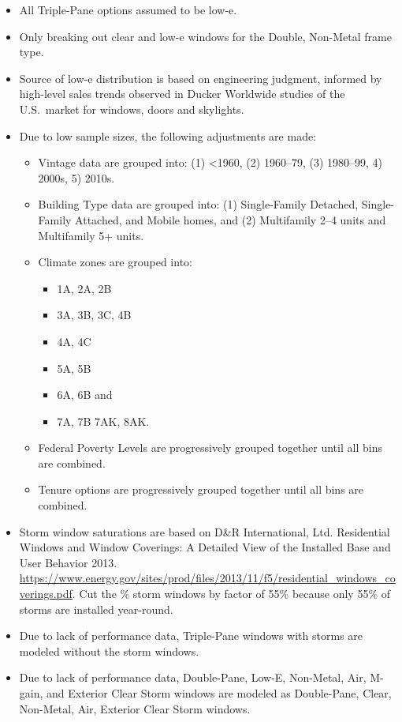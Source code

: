 \begin{itemize}

\item
  All Triple-Pane options assumed to be low-e.
\item
  Only breaking out clear and low-e windows for the Double, Non-Metal
  frame type.
\item
  Source of low-e distribution is based on engineering judgment,
  informed by high-level sales trends observed in Ducker Worldwide
  studies of the U.S.~market for windows, doors and skylights.
\item
  Due to low sample sizes, the following adjustments are made:

  \begin{itemize}
   
  \item
    Vintage data are grouped into: (1) \textless1960, (2) 1960--79,
    (3) 1980--99, 4) 2000s, 5) 2010s.
  \item
    Building Type data are grouped into: (1) Single-Family
    Detached, Single-Family Attached, and Mobile homes, and (2)
    Multifamily 2--4 units and Multifamily 5+ units.
  \item
    Climate zones are grouped into: 
    \begin{itemize}
        \item 1A, 2A, 2B
  
\item 3A, 3B, 3C, 4B
\item 4A, 4C
\item 5A, 5B
\item6A, 6B and
\item 7A, 7B 7AK, 8AK.
  \end{itemize}
  \end{itemize}

  \begin{itemize}
   
  \item
    Federal Poverty Levels are progressively grouped together
    until all bins are combined.
  \item
    Tenure options are progressively grouped together until all
    bins are combined.
  \end{itemize}
\item
  Storm window saturations are based on D\&R International, Ltd.
  \textquotesingle Residential Windows and Window Coverings: A Detailed
  View of the Installed Base and User Behavior\textquotesingle{} 2013.
  \url{https://www.energy.gov/sites/prod/files/2013/11/f5/residential_windows_coverings.pdf}.
  Cut the \% storm windows by factor of 55\% because only 55\% of storms
  are installed year-round.
\item
  Due to lack of performance data, Triple-Pane windows with storms are
  modeled without the storm windows.
\item
  Due to lack of performance data, Double-Pane, Low-E, Non-Metal, Air,
  M-gain, and Exterior Clear Storm windows are modeled as Double-Pane,
  Clear, Non-Metal, Air, Exterior Clear Storm windows.
\end{itemize}
